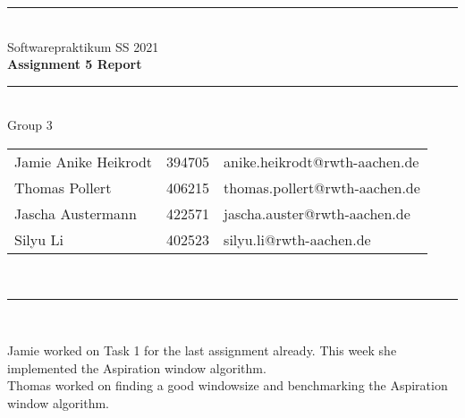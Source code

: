 \documentclass[a4paper,12pt]{article}
\begin{document}
\begin{center}
	\rule{\textwidth}{0.1pt}\\[1cm]
	
	\Large Softwarepraktikum SS 2021\\\bf Assignment 5 Report %
\end{center}


\begin{center}

	\rule{\textwidth}{0.1pt}\\[0.5cm]

	{\Large Group 3\\[5mm]} %

	\begin{tabular}{lll}
		Jamie Anike Heikrodt & 394705 & anike.heikrodt@rwth-aachen.de \\

		Thomas Pollert & 406215 & thomas.pollert@rwth-aachen.de \\
		
		Jascha Austermann & 422571 & jascha.auster@rwth-aachen.de \\

		Silyu Li & 402523 & silyu.li@rwth-aachen.de \\

	\end{tabular}\\[0.5cm]

	\rule{\textwidth}{0.1pt}\\[1cm]
	
\end{center}

\newpage
\tableofcontents

Jamie worked on Task 1 for the last assignment already. This week she implemented the Aspiration window algorithm.\\
Thomas worked on finding a good windowsize and benchmarking the Aspiration window algorithm.



\end{document}
